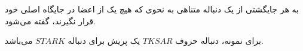 
\begin{DEFINITION}
    \p
    به هر جایگشتی از یک دنباله متناهی به نحوی که هیچ یک از اعضا در
    جایگاه اصلی خود قرار نگیرند،
    گفته می‌شود.
\end{DEFINITION}

\p
برای نمونه،
دنباله حروف
$TKSAR$
یک پریش برای دنباله
$STARK$
می‌باشد.


